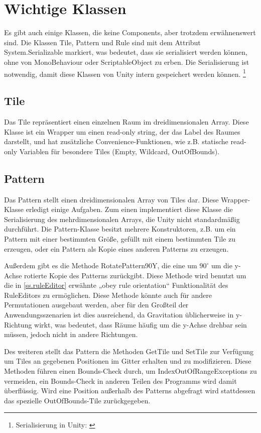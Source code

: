 \section{Wichtige Klassen}

Es gibt auch einige Klassen, die keine Components, aber trotzdem erwähnenswert sind. Die Klassen Tile, Pattern und Rule sind mit dem Attribut System.Serializable markiert, was bedeutet, dass sie serialisiert werden können, ohne von MonoBehaviour oder ScriptableObject zu erben. Die Serialisierung ist notwendig, damit diese Klassen von Unity intern gespeichert werden können.
\footnote{Serialisierung in Unity: \cite[Seite: script-Serialization]{unityManual}}

\subsection{Tile}

Das Tile repräsentiert einen einzelnen Raum im dreidimensionalen Array. Diese Klasse ist ein Wrapper um einen read-only string, der das Label des Raumes darstellt, und hat zusätzliche Convenience-Funktionen, wie z.B. statische read-only Variablen für besondere Tiles (Empty, Wildcard, OutOfBounds).

\subsection{Pattern}

Das Pattern stellt einen dreidimensionalen Array von Tiles dar. Diese Wrapper-Klasse erledigt einige Aufgaben. Zum einen implementiert diese Klasse die Serialisierung des mehrdimensionalen Arrays, die Unity nicht standardmäßig durchführt. Die Pattern-Klasse besitzt mehrere Konstruktoren, z.B. um ein Pattern mit einer bestimmten Größe, gefüllt mit einem bestimmten Tile zu erzeugen, oder ein Pattern als Kopie eines anderen Patterns zu erzeugen. 

Außerdem gibt es die Methode RotatePattern90Y, die eine um $ 90^\circ $ um die y-Achse rotierte Kopie des Patterns zurückgibt. Diese Methode wird benutzt um die in \ref{ss.ruleEditor} erwähnte „obey rule orientation“ Funktionalität des RuleEditors zu ermöglichen. Diese Methode könnte auch für andere Permutationen ausgebaut werden, aber für den Großteil der Anwendungsszenarien ist dies ausreichend, da Gravitation üblicherweise in y-Richtung wirkt, was bedeutet, dass Räume häufig um die y-Achse drehbar sein müssen, jedoch nicht in andere Richtungen.

Des weiteren stellt das Pattern die Methoden GetTile und SetTile zur Verfügung um Tiles an gegebenen Positionen im Gitter erhalten und zu modifizieren. Diese Methoden führen einen Bounds-Check durch, um IndexOutOfRangeExceptions zu vermeiden, ein Bounds-Check in anderen Teilen des Programms wird damit überflüssig. Wird eine Position außerhalb des Patterns abgefragt wird stattdessen das spezielle OutOfBounds-Tile zurückgegeben.

